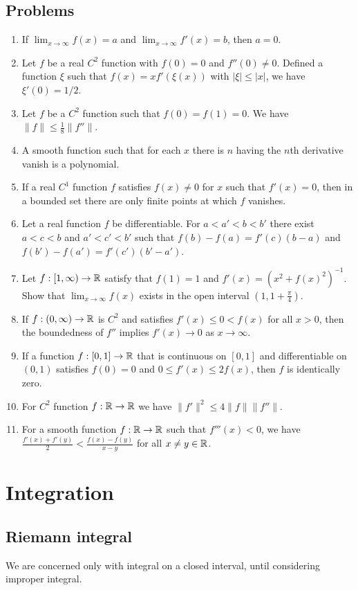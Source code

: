 \documentclass{../../large}
\begin{document}
\section*{Problems}
\begin{enumerate}
\item If $\lim_{x\to\infty}f(x)=a$ and $\lim_{x\to\infty}f'(x)=b$, then $a=0$.
\item Let $f$ be a real $C^2$ function with $f(0)=0$ and $f''(0)\ne0$.
Defined a function $\xi$ such that $f(x)=xf'(\xi(x))$ with $|\xi|\le|x|$, we have $\xi'(0)=1/2$.
\item Let $f$ be a $C^2$ function such that $f(0)=f(1)=0$.
We have $\|f\|\le\frac18\|f''\|$.
\item A smooth function such that for each $x$ there is $n$ having the $n$th derivative vanish is a polynomial.
\item If a real $C^1$ function $f$ satisfies $f(x)\ne0$ for $x$ such that $f'(x)=0$, then in a bounded set there are only finite points at which $f$ vanishes.
\item Let a real function $f$ be differentiable.
For $a<a'<b<b'$ there exist $a<c<b$ and $a'<c'<b'$ such that $f(b)-f(a)=f'(c)(b-a)$ and $f(b')-f(a')=f'(c')(b'-a')$.
\item Let $f:[1,\infty)\to\mathbb{R}$ satisfy that $f(1)=1$ and $f'(x)=(x^2+f(x)^2)^{-1}$. Show that $\lim_{x\to\infty}f(x)$ exists in the open interval $(1,1+\frac\pi4)$.
\item If $f:(0,\infty)\to\mathbb{R}$ is $C^2$ and satisfies $f'(x)\le0<f(x)$ for all $x>0$, then the boundedness of $f''$ implies $f'(x)\to0$ as $x\to\infty$.
\item If a function $f:[0,1]\to\mathbb{R}$ that is continuous on $[0,1]$ and differentiable on $(0,1)$ satisfies $f(0)=0$ and $0\le f'(x)\le2f(x)$, then $f$ is identically zero.
\item For $C^2$ function $f:\mathbb{R}\to\mathbb{R}$ we have $\|f'\|^2\le4\|f\|\|f''\|$.
\item For a smooth function $f:\mathbb{R}\to\mathbb{R}$ such that $f'''(x)<0$, we have $\frac{f'(x)+f'(y)}2<\frac{f(x)-f(y)}{x-y}$ for all $x\ne y\in\mathbb{R}$.
\end{enumerate}






\chapter{Integration}

\section{Riemann integral}
We are concerned only with integral on a closed interval, until considering improper integral.
\end{document}
